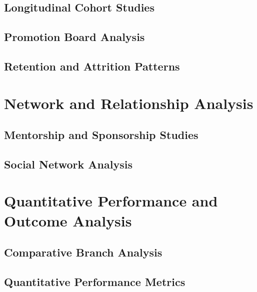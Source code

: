 \documentclass[12pt,a4paper]{article}
\begin{document}
\subsection{Longitudinal Cohort Studies}


\subsection{Promotion Board Analysis}


\subsection{Retention and Attrition Patterns}


\newpage
\section{Network and Relationship Analysis}

\subsection{Mentorship and Sponsorship Studies}


\subsection{Social Network Analysis}


\newpage
\section{Quantitative Performance and Outcome Analysis}

\subsection{Comparative Branch Analysis}


\subsection{Quantitative Performance Metrics}

\end{document}
